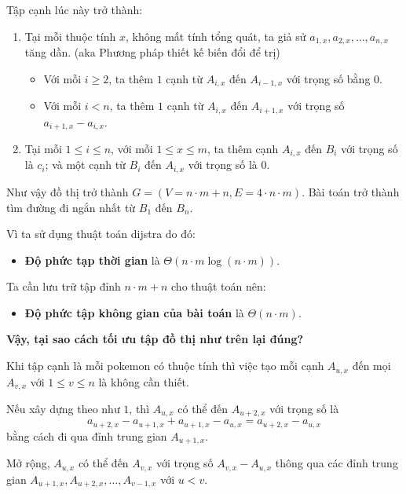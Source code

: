 \documentclass[12pt,a4paper]{article}
\begin{document}
Tập cạnh lúc này trở thành:
\begin{enumerate}
	\item Tại mỗi thuộc tính $x$, không mất tính tổng quát, ta giả sử $a_{1, x}, a_{2, x}, \ldots, a_{n, x}$ tăng dần. (aka Phương pháp thiết kế biến đổi để trị)
	\begin{itemize}
		\item Với mỗi $i \ge 2$, ta thêm $1$ cạnh từ $A_{i, x}$ đến $A_{i-1, x}$ với trọng số bằng $0$.
		\item Với mỗi $i < n$, ta thêm $1$ cạnh từ $A_{i, x}$ đến $A_{i+1, x}$ với trọng số $a_{i+1, x} - a_{i, x}$.
	\end{itemize}
	
	\item Tại mỗi $1 \le i \le n$, với mỗi $1 \le x \le m$, ta thêm cạnh $A_{i, x}$ đến $B_{i}$ với trọng số là $c_i$; và một cạnh từ $B_{i}$ đến $A_{i, x}$ với trọng số là $0$.
	
\end{enumerate}

Như vậy đồ thị trở thành $G = (V = n \cdot m + n, E = 4 \cdot n \cdot m)$. Bài toán trở thành tìm đường đi ngắn nhất từ $B_1$ đến $B_n$.

Vì ta sử dụng thuật toán dijstra do đó:
\begin{itemize}
	\item \textbf{Độ phức tạp thời gian} là $\Theta(n \cdot m \log {(n \cdot m)})$.
\end{itemize}

Ta cần lưu trữ tập đỉnh $n \cdot m + n$ cho thuật toán nên:
\begin{itemize}
\item \textbf{Độ phức tập không gian của bài toán} là $\Theta(n \cdot m)$.
\end{itemize}


\textbf{Vậy, tại sao cách tối ưu tập đồ thị như trên lại đúng?}

Khi tập cạnh là mỗi pokemon có thuộc tính thì việc tạo mỗi cạnh $A_{u, x}$ đến mọi $A_{v, x}$ với $1 \le v \le n$ là không cần thiết.

Nếu xây dựng theo như $1$, thì $A_{u, x}$ có thể đến $A_{u+2, x}$ với trọng số là $$a_{u+2, x} - a_{u+1, x} + a_{u+1, x} - a_{u,x} = a_{u+2, x}-a_{u, x}$$ bằng cách đi qua đỉnh trung gian $A_{u+1, x}$. 

Mở rộng, $A_{u, x}$ có thể đến $A_{v, x}$ với trọng số $A_{v, x} - A_{u, x}$ thông qua các đỉnh trung gian $A_{u+1, x}, A_{u+2, x}, \ldots, A_{v-1, x}$ với $u < v$.
\end{document}
